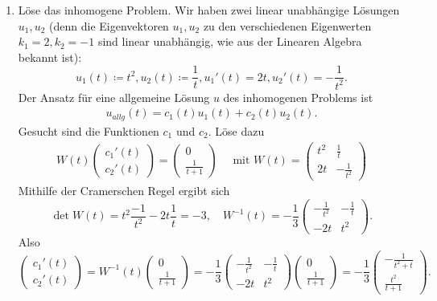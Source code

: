 \documentclass[a4paper,fontsize=8pt,DIV=1]{article}
\theoremstyle{plain}
\begin{document}
\begin{enumerate}[label=(\alph*)]
\begin{enumerate}[label=\arabic*.)]
        \item Löse das inhomogene Problem. Wir haben zwei linear unabhängige Lösungen $u_1, u_2$ (denn die Eigenvektoren $u_1,u_2$ zu den verschiedenen Eigenwerten $k_1=2, k_2=-1$ sind linear unabhängig, wie aus der Linearen Algebra bekannt ist):
        \[
            u_1(t) \coloneqq t^2, u_2(t) \coloneqq \frac{1}{t}, u_1'(t) = 2t, u_2'(t) = -\frac{1}{t^2}.
        \]
        Der Ansatz für eine allgemeine Lösung $u$ des inhomogenen Problems ist
        \begin{align}\label{ansatz}
        	u_{allg}(t) = c_1(t)u_1(t) + c_2(t)u_2(t) .
        \end{align}
        Gesucht sind die Funktionen $c_1$ und $c_2$. Löse dazu
        \begin{align}\label{dickesboot}
        	W(t)\begin{pmatrix}c_1'(t) \\ c_2'(t)\end{pmatrix} = \begin{pmatrix} 0 \\ \frac{1}{t+1} \end{pmatrix} \quad \text{ mit } W(t) = \begin{pmatrix} t^2 & \frac{1}{t} \\ 2t & -\frac{1}{t^2} \end{pmatrix}
        \end{align}
        Mithilfe der Cramerschen Regel ergibt sich
        \[
        	\det{W(t)} = t^2 \frac{-1}{t^2} - 2t \frac{1}{t} = -3, \quad W^{-1}(t) = -\frac{1}{3} \begin{pmatrix} -\frac{1}{t^2} & -\frac{1}{t} \\ -2t & t^2 \end{pmatrix}.
        \]
        Also
        \[
        	\begin{pmatrix}c_1'(t) \\ c_2'(t)\end{pmatrix} = W^{-1}(t)  \begin{pmatrix} 0 \\ \frac{1}{t+1} \end{pmatrix} = -\frac{1}{3} \begin{pmatrix} -\frac{1}{t^2} & -\frac{1}{t} \\ -2t & t^2 \end{pmatrix} \begin{pmatrix} 0 \\ \frac{1}{t+1} \end{pmatrix} = -\frac{1}{3} \begin{pmatrix}-\frac{1}{t^2+t} \\ \frac{t^2}{t+1}\end{pmatrix}.
\]
\end{enumerate}
\end{enumerate}
\end{document}

